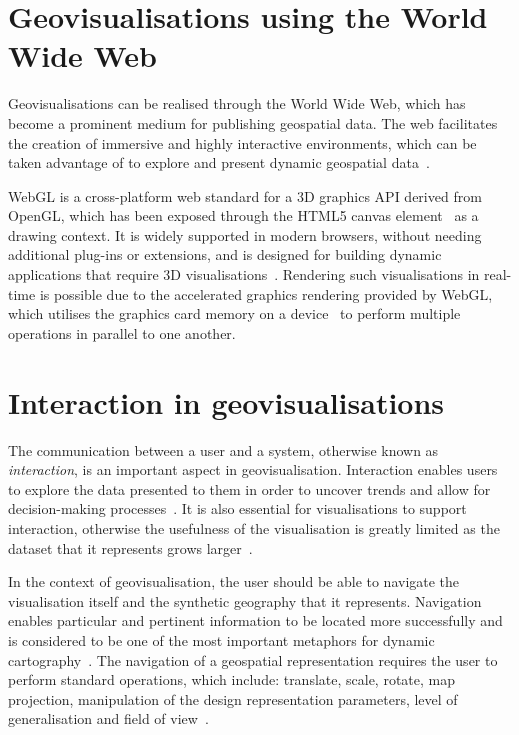 \section{Geovisualisations using the World Wide Web} {

	Geovisualisations can be realised through the World Wide Web, which has become a prominent medium for publishing geospatial data. The web facilitates the creation of immersive and highly interactive environments, which can be taken advantage of to explore and present dynamic geospatial data~\parencite{maceachren2001research}.

	WebGL is a cross-platform web standard for a 3D graphics API derived from OpenGL, which has been exposed through the HTML5 canvas element~\parencite{marrin2011webgl} as a drawing context. It is widely supported in modern browsers, without needing additional plug-ins or extensions, and is designed for building dynamic applications that require 3D visualisations~\parencite{chaturvedi2015web, marrin2011webgl, parisi2012webgl}. Rendering such visualisations in real-time is possible due to the accelerated graphics rendering provided by WebGL, which utilises the graphics card memory on a device~\parencite{chaturvedi2015web} to perform multiple operations in parallel to one another.

}

\section{Interaction in geovisualisations} {

	The communication between a user and a system, otherwise known as \emph{interaction}, is an important aspect in geovisualisation. Interaction enables users to explore the data presented to them in order to uncover trends and allow for decision-making processes~\parencite{yi2007toward}. It is also essential for visualisations to support interaction, otherwise the usefulness of the visualisation is greatly limited as the dataset that it represents grows larger~\parencite{yi2007toward}.

	In the context of geovisualisation, the user should be able to navigate the visualisation itself and the synthetic geography that it represents. Navigation enables particular and pertinent information to be located more successfully and is considered to be one of the most important metaphors for dynamic cartography~\parencite{cartwright2001geospatial}. The navigation of a geospatial representation requires the user to perform standard operations, which include: translate, scale, rotate, map projection, manipulation of the design representation parameters, level of generalisation and field of view~\parencite{cartwright2001geospatial, hand1997survey}.

}


